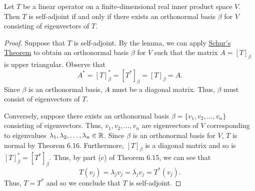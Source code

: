 \begin{theorem}
    Let \( T  \) be a linear operator on a finite-dimensional real inner product space \( V  \). Then \( T  \) is self-adjoint if and only if there exists an orthonormal basis \( \beta \) for \( V  \) consisting of eigenvectors of \( T  \).
\end{theorem}

\begin{proof}
Suppose that \( T  \) is self-adjoint. By the lemma, we can apply {\hyperref[Schur]{Schur's Theorem}} to obtain an orthonormal basis \( \beta  \) for \( V  \) such that the matrix \( A = [T]_{\beta} \) is upper triangular. Observe that
\[  A^{*} = [T]_{\beta}^{*} = [T^{*}]_{\beta} = [T]_{\beta} = A. \]
Since \( \beta \) is an orthonormal basis, \( A  \) must be a diagonal matrix. Thus, \( \beta  \) must consist of eigenvectors of \( T  \).

Conversely, suppose there exists an orthonormal basis \( \beta = \{ {v}_{1}, {v}_{2}, \dots, {v}_{n} \}  \) consisting of eigenvectors. Thus, \( {v}_{1}, {v}_{2}, \dots, {v}_{n} \) are eigenvectors of \( V  \) corresponding to eigenvalues \( {\lambda}_{1}, {\lambda}_{2}, \dots, {\lambda}_{n} \in \mathbb{R}  \). Since \(  \beta  \) is an orthonormal basis for \( V  \), \( T  \) is normal by Theorem 6.16. Furthermore, \( [T]_{\beta} \) is a diagonal matrix and so is \( [T]_{\beta}^{*} = [T^{*}]_{\beta} \). Thus, by part (c) of Theorem 6.15, we can see that  
\[  T({v}_{j}) = {\lambda}_{j} {v}_{j} = \overline{\lambda_j} {v}_{j} = T^{*}({v}_{j}). \]
Thus, \( T = T^{*}  \) and so we conclude that \( T  \) is self-adjoint.
\end{proof}
